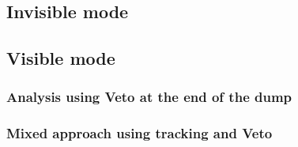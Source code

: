 \subsection{Invisible mode}
\label{chapter3:sec:selection-criteria-invis}

\subsection{Visible mode}
\label{chapter3:sec:selection-criteria-vis}

\subsubsection{Analysis using Veto at the end of the dump}
\label{chapter3:sec:vis-mode-veto}

\subsubsection{Mixed approach using tracking and Veto}
\label{chapter3:sec:vis-mode-tracking}

